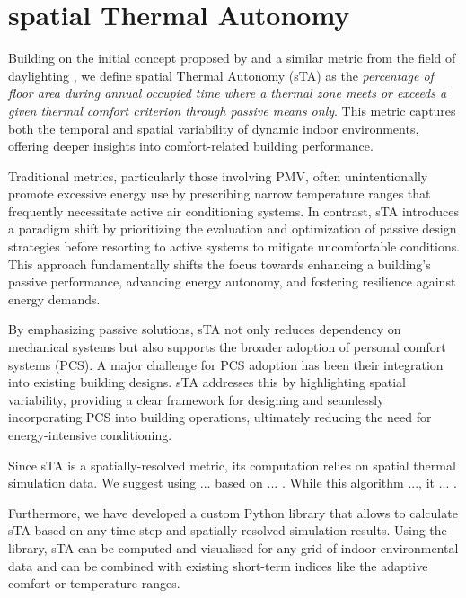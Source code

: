 
\section{spatial Thermal Autonomy}
\label{sec:sta}


Building on the initial concept proposed by \citet{levitt_thermal_2013} and a similar metric from the field of daylighting \citep{heschong_approved_2012}, we define spatial Thermal Autonomy (sTA) as the \textit{percentage of floor area during annual occupied time where a thermal zone meets or exceeds a given thermal comfort criterion through passive means only}. This metric captures both the temporal and spatial variability of dynamic indoor environments, offering deeper insights into comfort-related building performance.

Traditional metrics, particularly those involving PMV, often unintentionally promote excessive energy use by prescribing narrow temperature ranges that frequently necessitate active air conditioning systems. In contrast, sTA introduces a paradigm shift by prioritizing the evaluation and optimization of passive design strategies before resorting to active systems to mitigate uncomfortable conditions. This approach fundamentally shifts the focus towards enhancing a building’s passive performance, advancing energy autonomy, and fostering resilience against energy demands.

By emphasizing passive solutions, sTA not only reduces dependency on mechanical systems but also supports the broader adoption of personal comfort systems (PCS). A major challenge for PCS adoption has been their integration into existing building designs. sTA addresses this by highlighting spatial variability, providing a clear framework for designing and seamlessly incorporating PCS into building operations, ultimately reducing the need for energy-intensive conditioning.

Since sTA is a spatially-resolved metric, its computation relies on spatial thermal simulation data. We suggest using ... based on ... . While this algorithm ..., it ... .

Furthermore, we have developed a custom Python library that allows to calculate sTA based on any time-step and spatially-resolved simulation results. Using the library, sTA can be computed and visualised for any grid of indoor environmental data and can be combined with existing short-term indices like the adaptive comfort or temperature ranges.


